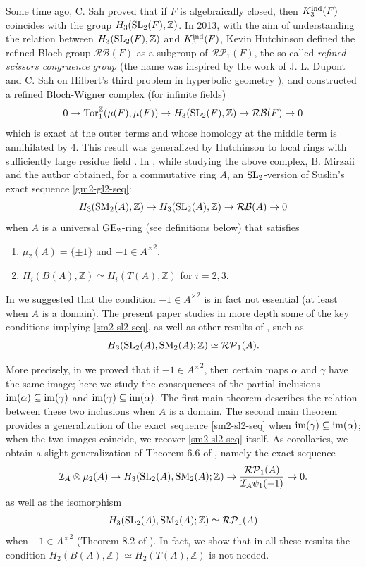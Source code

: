 \documentclass[11pt]{amsart}
\theoremstyle{definition}
\theoremstyle{plain}
\theoremstyle{definition}
\numberwithin{equation}{section}
\newcommand{\z}{\mathbb{Z}}
\newcommand{\II}{\mathcal{I}}
\newcommand{\RP}{\mathcal{RP}}
\newcommand{\RB}{\mathcal{RB}}
\renewcommand{\aa}{{A^\times}}
\newcommand{\tors}{{{\rm Tor}_1^{\z}}}
\newcommand{\GE}{{\rm GE}}
\newcommand{\SL}{\mathit{{\rm SL}}}
\newcommand{\SM}{\mathit{{\rm SM}}}
\newcommand{\im}{{\rm im}}
\newcommand{\ind}{{\rm ind}}
\begin{document}
	Some time ago, C. Sah proved that if $F$ is algebraically closed, then $K^\ind_3(F)$ coincides with the group $H_3(\SL_2(F),\z)$. In 2013, with the aim of understanding the relation between $H_3(\SL_2(F),\z)$ and $K_3^\ind(F)$, Kevin Hutchinson \cite{hutchinson-2013} defined the refined Bloch group $\RB(F)$ as a subgroup of $\RP_1(F)$, the so-called {\it refined scissors congruence group} (the name was inspired by the work of J. L. Dupont and C. Sah on Hilbert's third problem in hyperbolic geometry \cite{dupont-sah1982}), and constructed a refined Bloch-Wigner complex (for infinite fields)
	\[
	0\to \tors(\mu(F),\mu(F))\to H_3(\SL_2(F),\z)\to\RB(F)\to 0
	\]
	which is exact at the outer terms and whose homology at the middle term is annihilated by $4$.
	This result was generalized by Hutchinson to local rings with sufficiently large residue field \cite{hutchinson2017}. In \cite{B-E--2023}, while studying the above complex, B. Mirzaii and the author obtained, for a commutative ring $A$, an $\SL_2$-version of Suslin's exact sequence \eqref{gm2-gl2-seq}: 
	\begin{equation}\label{sm2-sl2-seq}
		H_3(\SM_2(A),\z)\to H_3(\SL_2(A),\z)\to\RB(A)\to 0
	\end{equation}
	when $A$ is a universal $\GE_2$-ring (see definitions below) that satisfies
	\begin{enumerate}
		\item $\mu_2(A)=\{\pm 1\}$ and $-1\in\aa^2$.
		\item $H_i(B(A),\z)\simeq H_i(T(A),\z)$ for $i=2,3$.
	\end{enumerate}
	In \cite[Remark 6.7]{B-E--2023} we suggested that the condition $-1\in\aa^2$ is in fact not essential (at least when $A$ is a domain).
	The present paper studies in more depth some of the key conditions implying \eqref{sm2-sl2-seq}, as well as other results of \cite{B-E--2023}, such as
	\begin{equation}\label{sl2-sm2-rel}
		H_3(\SL_2(A),\SM_2(A);\z)\simeq \RP_1(A).
	\end{equation}
	
	More precisely, in \cite[Corollary 6.4]{B-E--2023} we proved that if $-1\in\aa^2$, then certain maps $\alpha$ and $\gamma$ have the same image; here we study the consequences of the partial inclusions $\im(\alpha)\subseteq\im(\gamma)$ and $\im(\gamma)\subseteq\im(\alpha)$. The first main theorem describes the relation between these two inclusions when $A$ is a domain. The second main theorem provides a generalization of the exact sequence \eqref{sm2-sl2-seq} when $\im(\gamma)\subseteq\im(\alpha)$; when the two images coincide, we recover \eqref{sm2-sl2-seq} itself.
	As corollaries, we obtain a slight generalization of Theorem 6.6 of \cite{B-E--2023}, namely the exact sequence
	\[
	\II_A\otimes\mu_2(A)\to H_3(\SL_2(A),\SM_2(A);\z)\to \frac{\RP_1(A)}{\II_A\psi_1(-1)}\to 0.
	\]
	as well as the isomorphism
	\[
	H_3(\SL_2(A),\SM_2(A);\z)\simeq \RP_1(A)
	\]
	when $-1\in\aa^2$ (Theorem 8.2 of \cite{B-E--2023}). In fact, we show that in all these results the condition $H_2(B(A),\z)\simeq H_2(T(A),\z)$ is not needed.
	
\end{document}
